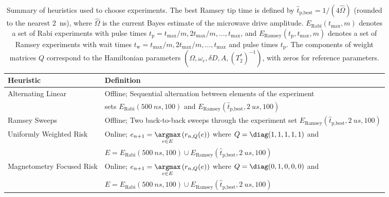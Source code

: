 \documentclass[aps,nofootinbib,twocolumn,superscriptaddress]{revtex4}
\newcommand{\Rabi}{\text{Rabi}}
\newcommand{\Ramsey}{\text{Ramsey}}
\newcommand{\tp}{t_\text{p}}
\newcommand{\tw}{t_\text{w}}
\begin{document}
\newcommand{\mystrut}{\rule{0pt}{1.5\normalbaselineskip}}
\begin{table*}[t]
    \centering
    \begin{tabularx}{\textwidth}{m{15em}X}
        \textbf{Heuristic} & \textbf{Definition} \\
        \hline\mystrut
        Alternating Linear
            & Offline; Sequential alternation between elements of 
                the experiment \\ 
                & sets
                $E_\Rabi(\SI{500}{ns},100)$ and 
                $E_\Ramsey(\hat{t}_{\text{p,best}},\SI{2}{us},100)$ \\
        \hline\mystrut
        Ramsey Sweeps
            & Offline; 
                Two back-to-back sweeps through
                the experiment set 
                $E_\Ramsey(\hat{t}_{\text{p,best}},\SI{2}{us},100)$ \\
        \hline\mystrut
        Uniformly Weighted Risk 
            & Online;
                $e_{n+1}=\underset{e\in E}{\argmax}\left(r_{n,Q}(e)\right)$
                where $Q=\diag(1,1,1,1,1)$ and \\
                & $E=E_\Rabi(\SI{500}{ns},100)\cup
                E_\Ramsey(\hat{t}_{\text{p,best}},\SI{2}{us},100)$ \\
        \hline\mystrut
        Magnetometry Focused Risk
            & Online;
                    $e_{n+1}=\underset{e\in E}{\argmax}\left(r_{n,Q}(e)\right)$
                    where $Q=\diag(0,1,0,0,0)$ and \\
                    & $E=E_\Rabi(\SI{500}{ns},100)\cup
                    E_\Ramsey(\hat{t}_{\text{p,best}},\SI{2}{us},100)$ \\
        \hline
    \end{tabularx}
    \caption{Summary of heuristics used to choose experiments.
        The best Ramsey tip time is defined by
        $\hat{t}_{\text{p,best}}=1/(4\hat{\Omega})$ (rounded to the nearest
        \SI{2}{ns}), where $\hat\Omega$ is the current
        Bayes estimate of the microwave drive amplitude.
        $E_\Rabi(t_{\max},m)$ denotes a set of Rabi experiments with pulse 
        times $\tp=t_{\max}/m,2t_{\max}/m,\ldots,t_{\max}$, and 
        $E_\Ramsey(\tp, t_{\max},m)$ denotes a set of Ramsey experiments with wait times
        $\tw=t_{\max}/m,2t_{\max}/m,\ldots,t_{\max}$ and pulse times $\tp$.
        The components of weight matrices $Q$ correspond to the
        Hamiltonian parameters
        $(\Omega,\omega_e,\delta D,A,(T_2^*)^{-1})$, with
        zeros for reference parameters.
    }
    \label{tab:heuristics}
\end{table*}   
\end{document}
